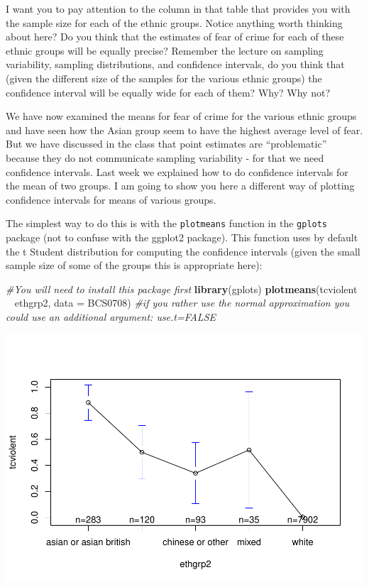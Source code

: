 \documentclass[]{book}
\newenvironment{Shaded}{\begin{snugshade}}{\end{snugshade}}
\newcommand{\CommentTok}[1]{\textcolor[rgb]{0.56,0.35,0.01}{\textit{#1}}}
\newcommand{\DataTypeTok}[1]{\textcolor[rgb]{0.13,0.29,0.53}{#1}}
\newcommand{\KeywordTok}[1]{\textcolor[rgb]{0.13,0.29,0.53}{\textbf{#1}}}
\newcommand{\NormalTok}[1]{#1}
\newcommand{\OperatorTok}[1]{\textcolor[rgb]{0.81,0.36,0.00}{\textbf{#1}}}
\newcommand{\StringTok}[1]{\textcolor[rgb]{0.31,0.60,0.02}{#1}}
\theoremstyle{definition}
\theoremstyle{definition}
\theoremstyle{definition}
\theoremstyle{remark}
\begin{document}
I want you to pay attention to the column in that table that provides
you with the sample size for each of the ethnic groups. Notice anything
worth thinking about here? Do you think that the estimates of fear of
crime for each of these ethnic groups will be equally precise? Remember
the lecture on sampling variability, sampling distributions, and
confidence intervals, do you think that (given the different size of the
samples for the various ethnic groups) the confidence interval will be
equally wide for each of them? Why? Why not?

We have now examined the means for fear of crime for the various ethnic
groups and have seen how the Asian group seem to have the highest
average level of fear. But we have discussed in the class that point
estimates are ``problematic'' because they do not communicate sampling
variability - for that we need confidence intervals. Last week we
explained how to do confidence intervals for the mean of two groups. I
am going to show you here a different way of plotting confidence
intervals for means of various groups.

The simplest way to do this is with the \texttt{plotmeans} function in
the \texttt{gplots} package (not to confuse with the ggplot2 package).
This function uses by default the t Student distribution for computing
the confidence intervals (given the small sample size of some of the
groups this is appropriate here):

\begin{Shaded}
\begin{Highlighting}[]
\CommentTok{#You will need to install this package first}
\KeywordTok{library}\NormalTok{(gplots)}
\KeywordTok{plotmeans}\NormalTok{(tcviolent }\OperatorTok{~}\StringTok{ }\NormalTok{ethgrp2, }\DataTypeTok{data =}\NormalTok{ BCS0708) }\CommentTok{#if you rather use the normal approximation you could use an additional argument: use.t=FALSE}
\end{Highlighting}
\end{Shaded}

\includegraphics{06-hypothesis_testing_files/figure-latex/unnamed-chunk-8-1.pdf}
\end{document}
